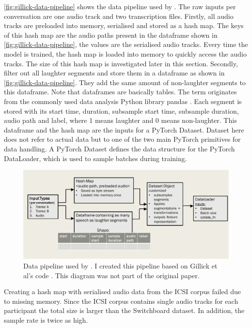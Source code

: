 \documentclass[bsc,frontabs,parskip,deptreport]{infthesis}
\begin{document}
\autoref{fig:gillick-data-pipeline} shows the data pipeline used by \citet{gillick2021robust}. The raw inputs per conversation are one audio track and two transcription files. 
Firstly, all audio tracks are preloaded into memory, serialised and stored as a hash map. The keys of this hash map are the audio paths present in the dataframe shown in \autoref{fig:gillick-data-pipeline}, the values are the serialised audio tracks. Every time the model is trained, the hash map is loaded into memory to quickly access the audio tracks. The size of this hash map is investigated later in this section.
Secondly, \citet{gillick2021robust} filter out all laughter segments and store them in a dataframe as shown in \autoref{fig:gillick-data-pipeline}.
They add the same amount of non-laughter segments to this dataframe. 
Note that dataframes are basically tables. The term originates from the commonly used data analysis Python library pandas \citep{jeff_reback_2021_5574486}.
Each segment is stored with its start time, duration, subsample start time, subsample duration, audio path and label, where 1 means laughter and 0 means non-laughter. 
This dataframe and the hash map are the inputs for a PyTorch Dataset. Dataset here does not refer to actual data but to one of the two main PyTorch primitives for data handling. A PyTorch Dataset defines the data structure for the PyTorch DataLoader, which is used to sample batches during training.

\begin{figure}
    \centering
    \includegraphics[width=14cm]{imgs/diagrams/Gillick_et_al_data_pipeline.png}
    \caption{Data pipeline used by \citet{gillick2021robust}. I created this pipeline based on Gillick et al's code \citep{gillick-codebase}. This diagram was not part of the original paper.}
    \label{fig:gillick-data-pipeline}
\end{figure}

Creating a hash map with serialised audio data from the ICSI corpus failed due to missing memory. Since the ICSI corpus contains single audio tracks for each participant the total size is larger than the Switchboard dataset. In addition, the sample rate is twice as high. 
\end{document}
